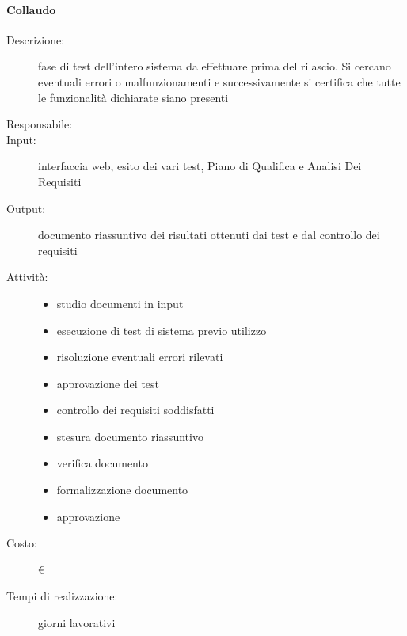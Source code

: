 \paragraph{Collaudo}
\begin{description}
\item[Descrizione:] fase di test dell’intero sistema da effettuare prima del rilascio. Si cercano
eventuali errori o malfunzionamenti e successivamente si certifica che tutte le funzionalità dichiarate siano presenti 

\item[Responsabile:] 

\item[Input:] interfaccia web, esito dei vari test, Piano di Qualifica e Analisi Dei Requisiti 

\item[Output:] documento riassuntivo dei risultati ottenuti dai test e dal controllo dei requisiti 

\item[Attività:]
\begin{itemize}
\item studio documenti in input
\item esecuzione di test di sistema previo utilizzo
\item risoluzione eventuali errori rilevati
\item approvazione dei test
\item controllo dei requisiti soddisfatti
\item stesura documento riassuntivo
\item verifica documento
\item formalizzazione documento
\item approvazione
\end{itemize}
\item[Costo:] \euro 
\item[Tempi di realizzazione:]  giorni lavorativi
\end{description}



